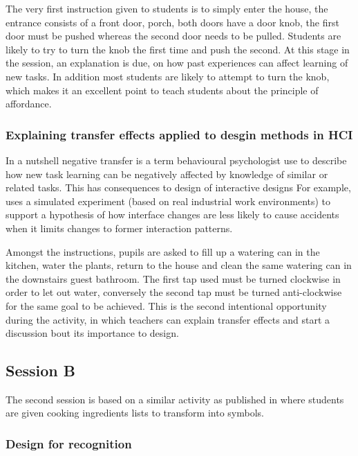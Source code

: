 \documentclass{sig-alternate}
\begin{document}
The very first instruction given to students is to simply enter the house, the entrance consists of a front door, porch, both doors have a door knob, the first door must be pushed whereas the second door needs to be pulled. Students are likely to try to turn the knob the first time and push the second. At this stage in the session, an explanation is due, on how past experiences can affect learning of new tasks. In addition most students are likely to attempt to turn the knob, which makes it an excellent point to teach students about the principle of affordance. 


\subsubsection*{Explaining transfer effects applied to desgin methods in HCI}
In a nutshell negative transfer\cite{Lunchin, Pan2010, Woltz} is a term behavioural psychologist use to describe how new task learning can be negatively affected by knowledge of similar or related tasks.
This has consequences to design of interactive designs \cite{waern1993varieties} For example,\cite{Besnard2005105} uses a simulated experiment (based on real industrial work environments) to support a hypothesis of how interface changes are less likely to cause accidents when it limits changes to former interaction patterns.

Amongst the instructions, pupils are asked to fill up a watering can in the kitchen, water the plants, return to the house and clean the same watering can in the downstairs guest bathroom. The first tap used must be turned clockwise in order to let out water, conversely the second tap must be turned anti-clockwise for the same goal to be achieved. This is the second intentional opportunity during the activity, in which teachers can explain transfer effects and start a discussion bout its importance to design.

\subsection{Session B}
The second session is based on a similar activity as published in \cite{fellows2005} where students are given cooking ingredients lists to transform into symbols.

\subsubsection*{Design for recognition}
 
\end{document}
